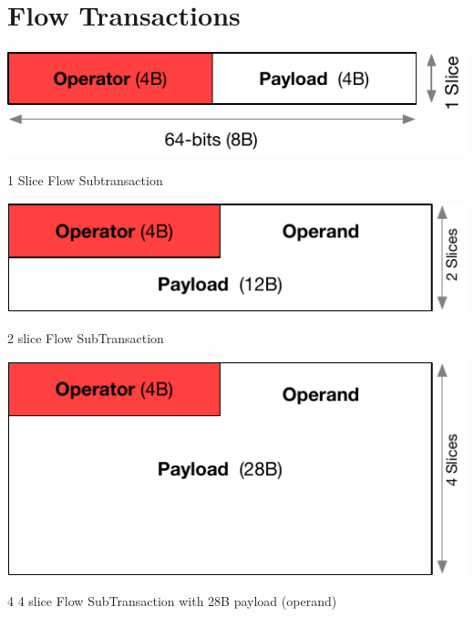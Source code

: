 \documentclass[../../../OAE-SPEC-MAIN.tex]{subfiles}
\begin{document}
\section{Flow Transactions}

\begin{marginfigure}[-55mm]
  \includegraphics[width=\linewidth]{./figures/1-slice.pdf}
  \caption{1  Slice Flow Subtransaction}
\end{marginfigure}

\begin{marginfigure}[-20mm]
    \includegraphics[width=\linewidth]{./figures/2-slice-operator.pdf}
  \caption{2 slice  Flow SubTransaction}%
\end{marginfigure}

\begin{marginfigure}
      \includegraphics[width=\linewidth]{./figures/4-slice-operator.pdf}
  \caption{4 4 slice Flow SubTransaction with 28B payload (operand) \vspace{15pt}} %
\end{marginfigure}
\end{document}
